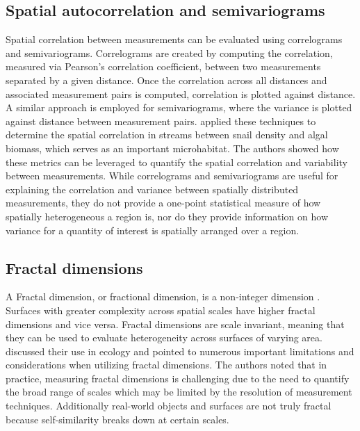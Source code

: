 \subsection{Spatial autocorrelation and semivariograms}
Spatial correlation between measurements can be evaluated using correlograms and semivariograms. Correlograms are created by computing the correlation, measured via Pearson’s correlation coefficient, between two measurements separated by a given distance. Once the correlation across all distances and associated measurement pairs is computed, correlation is plotted against distance. A similar approach is employed for semivariograms, where the variance is plotted against distance between measurement pairs. \textcite{cooper_quantifying_1997} applied these techniques to determine the spatial correlation in streams between snail density and algal biomass, which serves as an important microhabitat. The authors showed how these metrics can be leveraged to quantify the spatial correlation and variability between measurements. While correlograms and semivariograms are useful for explaining the correlation and variance between spatially distributed measurements, they do not provide a one-point statistical measure of how spatially heterogeneous a region is, nor do they provide information on how variance for a quantity of interest is spatially arranged over a region.

\subsection{Fractal dimensions}
 A Fractal dimension, or fractional dimension, is a non-integer dimension \parencite{mandelbrot_how_1967, mandelbrot_fractal_1983}. Surfaces with greater complexity across spatial scales have higher fractal dimensions and vice versa. Fractal dimensions are scale invariant, meaning that they can be used to evaluate heterogeneity across surfaces of varying area. \textcite{loke_measuring_2022} discussed their use in ecology and pointed to numerous important limitations and considerations when utilizing fractal dimensions. The authors noted that in practice, measuring fractal dimensions is challenging due to the need to quantify the broad range of scales which may be limited by the resolution of measurement techniques. Additionally real-world objects and surfaces are not truly fractal because self-similarity breaks down at certain scales. 

